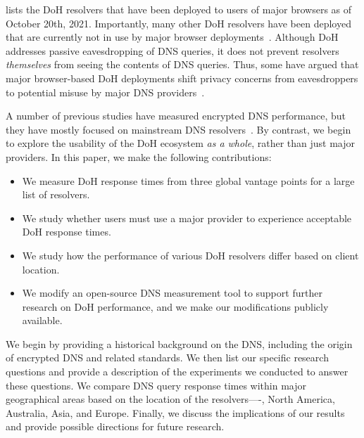  lists the DoH resolvers that have been deployed to users of major browsers as of October 20th, 2021.
Importantly, many other DoH resolvers have been deployed that are currently not in use by major browser deployments~\cite{dnscrypt-public-resolvers}.
Although DoH addresses passive eavesdropping of DNS queries, it does not prevent resolvers \emph{themselves} from seeing the contents of DNS queries.
Thus, some have argued that major browser-based DoH deployments shift privacy concerns from eavesdroppers to potential misuse by major DNS providers~\cite{vixie}.

A number of previous studies have measured encrypted DNS performance, but they have mostly focused on mainstream DNS resolvers~\cite{4,15,5}.
By contrast, we begin to explore the usability of the DoH ecosystem \emph{as a whole}, rather than just major providers.
In this paper, we make the following contributions:
\begin{itemize}
    \item We measure DoH response times from three global vantage points for a large list of resolvers.
    \item We study whether users must use a major provider to experience acceptable DoH response times.
    \item We study how the performance of various DoH resolvers differ based on client location.
    \item We modify an open-source DNS measurement tool to support further research on DoH performance, and we make our modifications publicly available.
\end{itemize}

We begin by providing a historical background on the DNS, including the origin of encrypted DNS and related standards.
We then list our specific research questions and provide a description of the experiments we conducted to answer these questions.
We compare DNS query response times within major geographical areas based on the location of the resolvers—-\ie, North America, Australia, Asia, and Europe.
Finally, we discuss the implications of our results and provide possible directions for future research.

